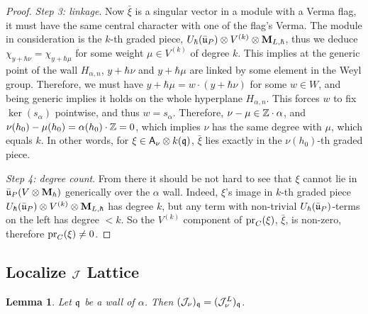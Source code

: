 \documentclass{article}
\theoremstyle{plain}
\newtheorem{lemma}[theorem]{Lemma}
\theoremstyle{definition}
\theoremstyle{remark}
\numberwithin{equation}{section}
\begin{document}
\begin{proof}
\emph{Step 3: linkage}. Now $\bar\xi$ is a  singular vector in a module with a Verma flag, it must have the same central character with one of the flag's Verma. The module in consideration is the $k$-th graded piece, $U_\hbar(\bar{\mathfrak{u}}_P)\otimes V^{(k)}\otimes \mathbf{M}_{L,\hbar}$, thus we deduce $\chi_{y+\hbar\nu} = \chi_{y+\hbar \mu}$ for some weight $\mu \in V^{(k)}$ of degree $k$. This implies at the generic point of the wall $H_{\alpha,n}$, $y+\hbar\nu$ and $y+\hbar\mu$ are linked by some element in the Weyl group. Therefore, we must have $y+\hbar \mu = w \cdot(y+\hbar \nu)$ for some $w\in W$, and being generic implies it holds on the whole hyperplane $H_{\alpha,n}$. This forces $w$ to fix $\ker(s_\alpha)$ pointwise, and thus $w=s_\alpha$. Therefore, $\nu - \mu \in \mathbb{Z} \cdot \alpha$, and $\nu(h_0) - \mu(h_0) =\alpha(h_0)\cdot \mathbb{Z} =0$, which implies $\nu$ has the same degree with $\mu$, which equals $k$. In other words, for $\xi \in \mathsf A_\nu \otimes k(\mathfrak q)$, $\bar\xi$ lies exactly in the $\nu(h_0)$-th graded piece.

\emph{Step 4: degree count}. From there it should be not hard to see that $\xi$ cannot lie in $\bar{\mathfrak{u}}_P (V\otimes \mathbf{M}_{\hbar})$ generically over the $\alpha$ wall. Indeed, $\xi$'s image in $k$-th graded piece $ U_\hbar(\bar{\mathfrak{u}}_P)\otimes V^{(k)}\otimes \mathbf{M}_{L,\hbar}$ has degree $k$, but any term with non-trivial $U_\hbar(\bar{\mathfrak{u}}_P)$-terms on the left has degree $<k$. So the $V^{(k)}$ component of $\operatorname{pr}_C(\xi)$, $\bar\xi$, is non-zero, therefore $\operatorname{pr}_C(\xi) \neq 0$.
\end{proof}


\subsection*{Localize $\mathcal J$ Lattice}
\begin{lemma}\label{lem:locJ}
Let $\mathfrak q$ be a wall of $\alpha$. Then $(\mathcal J_\nu)_\mathfrak q=(\mathcal J^L_\nu)_\mathfrak q$.
\end{lemma}
\end{document}

